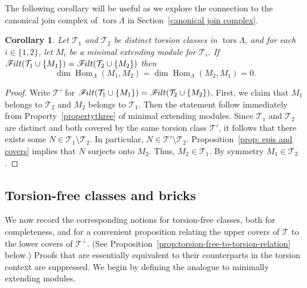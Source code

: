 \documentclass[10pt]{amsart}
\providecommand{\1}{}
\DeclareMathOperator{\tors}{tors}
\DeclareMathOperator{\Hom}{Hom}
\newcommand{\calT}{\mathcal{T}}
\newcommand{\filt}{\mathscr{F}\Mk ilt}
\renewcommand{\1}{\hat{1}}
\newcommand{\0}{\hat{0}}
\newcommand*{\Mk}{\mkern -2mu}
\newtheorem{corollary}[theorem]{Corollary}
\theoremstyle{definition}
\begin{document}
The following corollary will be useful as we explore the connection to
the canonical join complex of $\tors \Lambda$ in
Section~\ref{canonical join complex}.
\begin{corollary}\label{hom orthogonality}
Let $\calT_1$ and $\calT_2$ be distinct torsion classes in $\tors \Lambda$, and for each $i\in \{1,2\}$, let $M_i$ be a minimal extending module for $\calT_i$.
If $\filt(\calT_1 \cup \{M_1\}) = \filt(\calT_2 \cup \{M_2\})$ then \[\dim \Hom_{\Lambda}(M_1,M_2) = \dim \Hom_{\Lambda}(M_2,M_1)=0.\]
\end{corollary}
\begin{proof}
Write $\calT'$ for $\filt(\calT_1 \cup \{M_1\}) = \filt(\calT_2 \cup \{M_2\})$.
First, we claim that $M_1$ belongs to $\calT_2$ and $M_2$ belongs to $\calT_1$.
Then the statement follow immediately from Property~\ref{propertythree} of minimal extending modules.
Since $\calT_1$ and $\calT_2$ are distinct and both covered by the same torsion class $\calT'$, it follows that there exists some $N\in \calT_1\setminus \calT_2$.
In particular, $N\in \calT'\setminus \calT_2$.
Proposition~\ref{prop: epis and covers} implies that $N$ surjects onto $M_2$.
Thus, $M_2\in \calT_1$.
By symmetry $M_1\in \calT_2$.
\end{proof}
\subsection{Torsion-free classes and bricks}
We now record the corresponding notions for
torsion-free classes, both for completeness, and for a convenient
proposition relating the upper covers of $\calT$ to the lower
covers of $\calT^\perp$.
(See Proposition~\ref{prop:torsion-free-to-torsion-relation} below.)
Proofs that are essentially equivalent to their counterparts in the
torsion context are suppressed.
We begin by defining the analogue to minimally extending modules.
\end{document}
